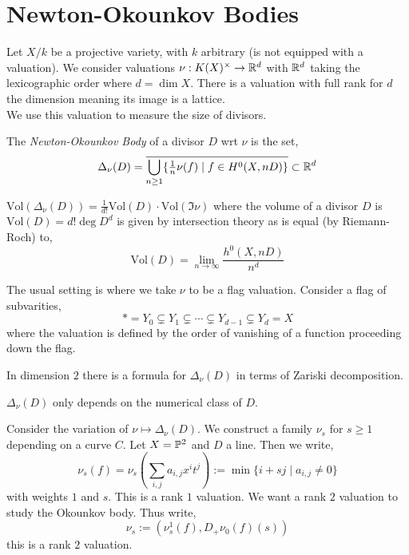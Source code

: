 \documentclass[12pt]{article}
\begin{document}
\section{Newton-Okounkov Bodies}

Let $X / k$ be a projective variety, with $k$ arbitrary (is not equipped with a valuation). We consider valuations $\nu : K(X)^\times \to \RR^d$ with $\RR^d$ taking the lexicographic order where $d = \dim{X}$. There is a valuation with full rank for $d$ the dimension meaning its image is a lattice. 
\bigskip\\
We use this valuation to measure the size of divisors. 

\begin{defn}
The \textit{Newton-Okounkov Body} of a divisor $D$ wrt $\nu$ is the set,
\[ \Delta_\nu(D) = \overline{ \bigcup_{n \ge 1} \{ \tfrac{1}{n} \nu(f) \mid f \in H^0(X, n D) \} } \subset \RR^d \]
\end{defn}

\newcommand{\Vol}{\mathrm{Vol}}

\begin{theorem}
$\Vol(\Delta_\nu(D)) = \frac{1}{d!} \Vol(D) \cdot \Vol(\Im{\nu})$ where the volume of a divisor $D$ is $\Vol(D) = d! \deg{D^d}$ is given by intersection theory as is equal (by Riemann-Roch) to,
\[ \Vol(D) = \lim_{n \to \infty} \frac{h^0(X, nD)}{n^d} \]
\end{theorem}

\begin{rmk}
The usual setting is where we take $\nu$ to be a flag valuation. Consider a flag of subvarities,
\[ * = Y_0 \subsetneq Y_1 \subsetneq \cdots \subsetneq Y_{d-1} \subsetneq Y_d = X \]
where the valuation is defined by the order of vanishing of a function proceeding down the flag.  
\end{rmk}

\begin{rmk}
In dimension $2$ there is a formula for $\Delta_\nu(D)$ in terms of Zariski decomposition.
\end{rmk}

\begin{rmk}
$\Delta_\nu(D)$ only depends on the numerical class of $D$. 
\end{rmk}

Consider the variation of $\nu \mapsto \Delta_\nu(D)$. We construct a family $\nu_s$ for $s \ge 1$ depending on a curve $C$. Let $X = \P^2$ and $D$ a line. Then we write,
\[ \nu_s(f) = \nu_s(\sum_{i,j} a_{i,j} x^i t^j) := \min \{ i + s j \mid a_{i,j} \neq 0 \} \]
with weights $1$ and $s$. This is a rank $1$ valuation. We want a rank $2$ valuation to study the Okounkov body. Thus write,
\[ \nu_s := (\nu_s^1(f), D_+ \nu_0(f)(s)) \]
this is a rank $2$ valuation. 
\end{document}
